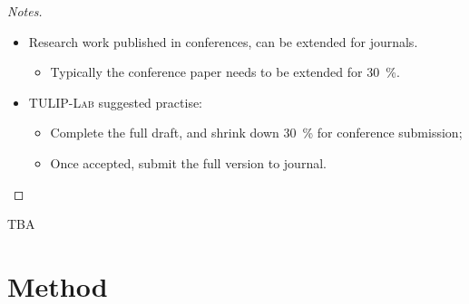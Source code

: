 \begin{slide}
{\begin{proof}[Notes]
\begin{itemize}
\begin{itemize}
	\item<6->
	The same idea should not be published twice in journals.
	\end{itemize}
	
\item<7->
Research work published in conferences,
can be extended for journals.
\begin{itemize}
\item<8->
Typically the conference paper needs to be extended for \SI{30}{\percent}.
\end{itemize}

\item<9->
\faMagic { } \textsc{TULIP-Lab} suggested practise:
\begin{itemize}
\item<10->
Complete the full draft, 
and shrink down \SI{30}{\percent} for conference submission;

\item<11->
Once accepted,
submit the full version to journal.
\end{itemize}
\end{itemize}
\end{proof}
}

\end{slide}
\begin{note}
	TBA
\end{note}


\section{Method}

